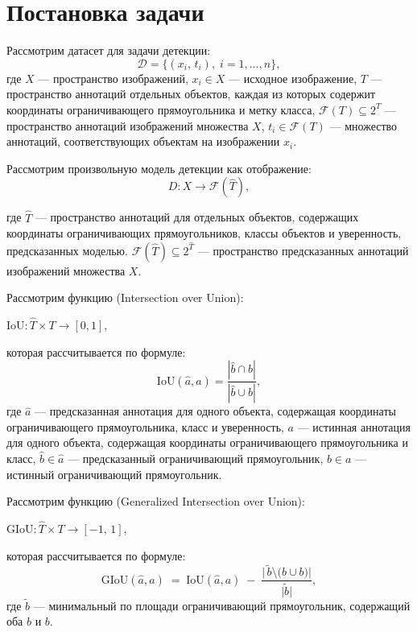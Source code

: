 \section{Постановка задачи}
\label{sec1}
Рассмотрим датасет для задачи детекции:
\[
\mathcal{D}
=
\bigl\{
  (x_i,\,t_i),
  \;
  i = 1,\dots,n
\bigr\},
\]
где $X$ — пространство изображений, $x_i \in X$ — исходное изображение, $T$ — пространство аннотаций отдельных объектов, каждая из которых содержит координаты ограничивающего прямоугольника и метку класса, $\mathcal{F}(T) \subseteq 2^{T}$ --- пространство аннотаций изображений множества $X$, $t_i \in \mathcal{F}(T)$ — множество аннотаций, соответствующих объектам на изображении $x_i$.



Рассмотрим произвольную модель детекции как отображение:
\[
D: X \to \mathcal{F}(\hat{T}),
\]

где $\hat{T}$ — пространство аннотаций для отдельных объектов, содержащих координаты ограничивающих прямоугольников, классы объектов и уверенность, предсказанных моделью. $\mathcal{F}(\hat{T}) \subseteq 2^{\hat{T}}$ — пространство предсказанных аннотаций изображений множества $X$.

Рассмотрим функцию  (Intersection over Union):
\begin{center}
   $\text{IoU}: \hat{T} \times {T} \to [0,1]$,
\end{center}
которая рассчитывается по формуле:
\[
\text{IoU}(\hat{a}, a) = \frac{|\hat{b} \cap b|}{|\hat{b} \cup b|},
\]
где $\hat{a}$ --- предсказанная аннотация для одного объекта, содержащая координаты ограничивающего прямоугольника, класс и уверенность, $a$ --- истинная аннотация для одного объекта, содержащая координаты ограничивающего прямоугольника и класс, \(\hat{b} \in \hat{a} \) --- предсказанный ограничивающий прямоугольник, \(b \in a \) --- истинный ограничивающий прямоугольник.

Рассмотрим функцию  (Generalized Intersection over Union):
\begin{center}
   $\text{GIoU}: \hat{T} \times T \to [-1,\,1]$,
\end{center}
которая рассчитывается по формуле:
\[
\text{GIoU}(\hat{a}, a) \;=\; \text{IoU}(\hat{a}, a) \;-\; \frac{\bigl\lvert\, \tilde{b} \setminus \bigl( \hat{b} \cup b \bigr)\bigr\rvert}{\lvert \tilde{b} \rvert},
\]
где \( \tilde{b} \) --- минимальный по площади ограничивающий прямоугольник, содержащий оба \( \hat{b} \) и \( b \).

